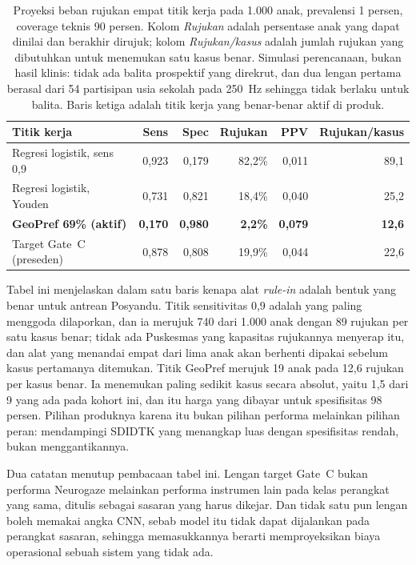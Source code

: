 \documentclass{article}
\begin{document}
\begin{table}[h]
\begin{center}
\small
\begin{tabular}{lrrrrr}
\toprule
\textbf{Titik kerja} & \textbf{Sens} & \textbf{Spec} & \textbf{Rujukan} & \textbf{PPV} &
\textbf{Rujukan/kasus} \\
\midrule
Regresi logistik, sens 0,9      & 0,923 & 0,179 & 82,2\% & 0,011 & 89,1 \\
Regresi logistik, Youden        & 0,731 & 0,821 & 18,4\% & 0,040 & 25,2 \\
\textbf{GeoPref 69\% (aktif)}   & \textbf{0,170} & \textbf{0,980} & \textbf{2,2\%} &
\textbf{0,079} & \textbf{12,6} \\
Target Gate~C (preseden)        & 0,878 & 0,808 & 19,9\% & 0,044 & 22,6 \\
\bottomrule
\end{tabular}
\end{center}
\caption{Proyeksi beban rujukan empat titik kerja pada 1.000 anak, prevalensi 1 persen,
coverage teknis 90 persen. Kolom \emph{Rujukan} adalah persentase anak yang dapat dinilai
dan berakhir dirujuk; kolom \emph{Rujukan/kasus} adalah jumlah rujukan yang dibutuhkan untuk
menemukan satu kasus benar. Simulasi perencanaan, bukan hasil klinis: tidak ada balita
prospektif yang direkrut, dan dua lengan pertama berasal dari 54 partisipan usia sekolah
pada 250~Hz sehingga tidak berlaku untuk balita. Baris ketiga adalah titik kerja yang
benar-benar aktif di produk.}
\label{tab:operasional}
\end{table}

Tabel ini menjelaskan dalam satu baris kenapa alat \emph{rule-in} adalah bentuk yang benar
untuk antrean Posyandu. Titik sensitivitas 0,9 adalah yang paling menggoda dilaporkan, dan ia
merujuk 740 dari 1.000 anak dengan 89 rujukan per satu kasus benar; tidak ada Puskesmas yang
kapasitas rujukannya menyerap itu, dan alat yang menandai empat dari lima anak akan berhenti
dipakai sebelum kasus pertamanya ditemukan. Titik GeoPref merujuk 19 anak pada 12,6 rujukan
per kasus benar. Ia menemukan paling sedikit kasus secara absolut, yaitu 1,5 dari 9 yang ada
pada kohort ini, dan itu harga yang dibayar untuk spesifisitas 98 persen. Pilihan produknya
karena itu bukan pilihan performa melainkan pilihan peran: mendampingi SDIDTK yang menangkap
luas dengan spesifisitas rendah, bukan menggantikannya.

Dua catatan menutup pembacaan tabel ini. Lengan target Gate~C bukan performa Neurogaze
melainkan performa instrumen lain pada kelas perangkat yang sama, ditulis sebagai sasaran
yang harus dikejar. Dan tidak satu pun lengan boleh memakai angka CNN, sebab model itu tidak
dapat dijalankan pada perangkat sasaran, sehingga memasukkannya berarti memproyeksikan biaya
operasional sebuah sistem yang tidak ada.
\end{document}
